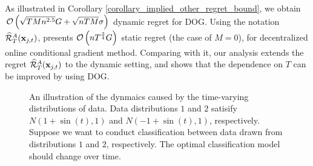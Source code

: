 \documentclass{article}
\begin{document}
As illustrated in Corollary \ref{corollary_implied_other_regret_bound}, we obtain ${\mathcal{O}\left( \sqrt{TMn^{2.5}}G + \sqrt{nTM}\sigma \right)}$ dynamic regret for DOG. Using the notation $\widehat{{\mathcal{R}}}_T^{A}({\bf x}_{j,t})$, \citep{pmlr-v70-zhang17g} presents ${\mathcal{O}\left( nT^{\frac{3}{4}}G \right)}$ static regret (the case of $M=0$), for decentralized online conditional gradient method. Comparing with it, our analysis extends the regret $\widehat{{\mathcal{R}}}_T^{A}({\bf x}_{j,t})$ to the dynamic setting, and shows that the dependence on $T$ can be improved by using DOG.

\begin{figure}[!]
\setlength{\abovecaptionskip}{0pt}
\setlength{\belowcaptionskip}{0pt}
\centering 
{}
\caption{An illustration of the dynmaics caused by the time-varying distributions of data. Data distributions $1$ and $2$ satisify $N(1+\sin(t), 1)$ and $N(-1+\sin(t), 1)$, respectively.  Suppose we want to conduct classification between data drawn from distributions $1$ and $2$, respectively. The optimal classification model should change over time.}
\label{figure_illus_dynamics}
\end{figure}
\end{document}
